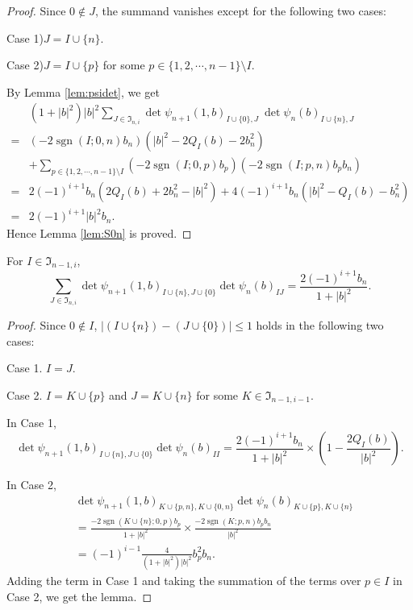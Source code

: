 \begin{proof}
Since $0 \notin J$, 
the summand vanishes
 except for the following two cases:
\par\noindent
Case 1)\enspace $J=I \cup \{ n \}$.  
\par\noindent
Case 2)\enspace $J=I \cup \{ p \}$
  for some $p \in \{1,2,\cdots,n-1\} \setminus I$.  



By Lemma \ref{lem:psidet}, 
 we get 
\begin{align*}
&  (1+|b|^2)|b|^2
  \sum_{J \in {\mathfrak{I}}_{n,i}}
  \det \psi_{n+1}(1,b)_{I \cup \{0\},  J}
\ \det \psi_{n}(b)_{I \cup \{n\},  J}  
\\
=& (-2 \operatorname{sgn}(I;0,n) b_n)
   (|b|^2 -2Q_{I}(b)-2b_n^2)
\\
  &+
  \sum_{p \in \{1,2,\cdots,n-1\}\setminus I}
  (-2 \operatorname{sgn}(I;0,p) b_p)
  (-2 \operatorname{sgn}(I;p,n) b_p b_n)
\\
=&2(-1)^{i+1} b_n(2 Q_{I}(b)+2b_n^2-|b|^2)
  +
  4(-1)^{i+1}b_n (|b|^2 - Q_{I}(b) -b_n^2)
\\
=& 2(-1)^{i+1} |b|^2 b_n.  
\end{align*}
Hence Lemma \ref{lem:S0n} is proved.  
\end{proof}
\begin{lemma}
\label{lem:Sn0}
For $I \in {\mathfrak{I}}_{n-1,i}$, 
\[
  \sum_{J \in {\mathfrak{I}}_{n,i}}
  \det \psi_{n+1}(1,b)_{I \cup \{n\}, J \cup \{0\}} \det \psi_n(b)_{I J}
=
 \frac{2(-1)^{i+1} b_n}{1+|b|^2}.  
\]
\end{lemma}
\begin{proof}
Since $0 \notin I$, 
$| (I \cup \{n\}) - (J \cup \{0\}) |\le 1$
 holds 
 in the following two cases:
\par\noindent
Case 1. \enspace
$I=J$.
\par\noindent
Case 2. \enspace
$I=K \cup \{p\}$
 and $J=K \cup \{n\}$
 for some $K \in {\mathfrak{I}}_{n-1,i-1}$.  
\par
In Case 1, 
\[
   \det \psi_{n+1}(1,b)_{I \cup \{n\}, J \cup \{0\}} 
   \det \psi_n(b)_{I I}
=
 \frac{2(-1)^{i+1} b_n}{1+|b|^2}
 \times 
(1-\frac{2 Q_I(b)}{|b|^2}).  
\]
\par
In Case 2, 
\begin{align*}
  &\det \psi_{n+1}(1,b)_{K \cup \{ p, n\}, K \cup \{ 0, n \}}
   \det \psi_{n}(b)_{K \cup \{ p \}, K \cup \{ n \}}
\\
&= \frac{-2 {\operatorname{sgn}}(K \cup \{n\};0,p)b_p}{1+|b|^2}
   \times 
   \frac{-2 {\operatorname{sgn}}(K;p,n)b_p b_n}{|b|^2}
\\
&= (-1)^{i-1} \frac{4}{(1+|b|^2) |b|^2} b_p^2 b_n.  
\end{align*}
Adding the term in Case 1 and taking the summation of the terms
 over $p \in I$ in Case 2, 
 we get the lemma.  
\end{proof}

